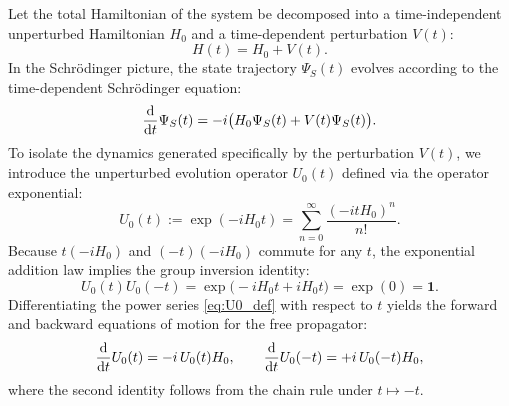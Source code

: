 \documentclass[11pt, a4paper]{article}
\numberwithin{equation}{section}
\begin{document}
Let the total Hamiltonian of the system be decomposed into a time-independent unperturbed Hamiltonian $H_0$ and a time-dependent perturbation $V(t)$:
\begin{equation}
  H(t) = H_0 + V(t).
\end{equation}
In the Schr\"odinger picture, the state trajectory $\Psi_S(t)$ evolves according to the time-dependent Schr\"odinger equation:
\begin{equation}\label{eq:schrodinger_eq}
  \dv{t} \Psi_S(t) = -i \big( H_0 \Psi_S(t) + V(t) \Psi_S(t) \big).
\end{equation}
To isolate the dynamics generated specifically by the perturbation $V(t)$, we introduce the unperturbed evolution operator $U_0(t)$ defined via the operator exponential:
\begin{equation}\label{eq:U0_def}
  U_0(t) := \exp(-i H_0 t) = \sum_{n=0}^{\infty} \frac{(-i t H_0)^n}{n!}.
\end{equation}
Because $t(-i H_0)$ and $(-t)(-i H_0)$ commute for any $t$, the exponential addition law implies the group inversion identity:
\begin{equation}\label{eq:U0_inv}
  U_0(t) U_0(-t) = \exp\!\big(-i H_0 t + i H_0 t\big) = \exp(0) = \mathbf{1}.
\end{equation}
Differentiating the power series \eqref{eq:U0_def} with respect to $t$ yields the forward and backward equations of motion for the free propagator:
\begin{equation}\label{eq:U0_derivs}
  \dv{t} U_0(t) = -i \, U_0(t) H_0, \qquad \dv{t} U_0(-t) = +i \, U_0(-t) H_0,
\end{equation}
where the second identity follows from the chain rule under $t \mapsto -t$.
\end{document}
